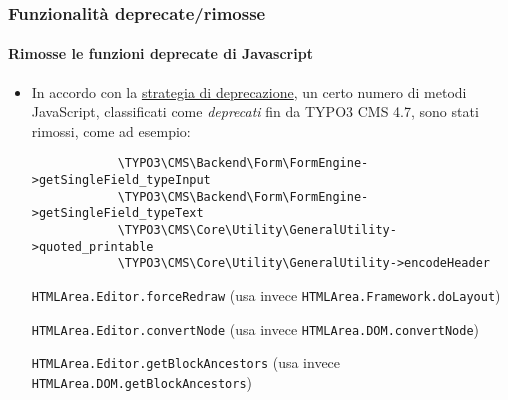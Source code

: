 \begin{frame}[fragile]
	\frametitle{Funzionalità deprecate/rimosse}
	\framesubtitle{Rimosse le funzioni deprecate di Javascript}

	\begin{itemize}
		\item In accordo con la \href{http://forge.typo3.org/projects/typo3v4-core/wiki/CoreDevPolicy}{strategia di deprecazione},
			un certo numero di metodi JavaScript, classificati come \textit{deprecati} fin da TYPO3 CMS 4.7, sono stati rimossi, come ad esempio:

		\begin{lstlisting}
			\TYPO3\CMS\Backend\Form\FormEngine->getSingleField_typeInput
			\TYPO3\CMS\Backend\Form\FormEngine->getSingleField_typeText
			\TYPO3\CMS\Core\Utility\GeneralUtility->quoted_printable
			\TYPO3\CMS\Core\Utility\GeneralUtility->encodeHeader
		\end{lstlisting}

		\smaller
			\texttt{HTMLArea.Editor.forceRedraw}\newline
				(usa invece \texttt{HTMLArea.Framework.doLayout})
				\vspace{0.2cm}

			\texttt{HTMLArea.Editor.convertNode}\newline
				(usa invece \texttt{HTMLArea.DOM.convertNode})
				\vspace{0.2cm}

			\texttt{HTMLArea.Editor.getBlockAncestors}\newline
				(usa invece \texttt{HTMLArea.DOM.getBlockAncestors})
		\normalsize

	\end{itemize}

\end{frame}


